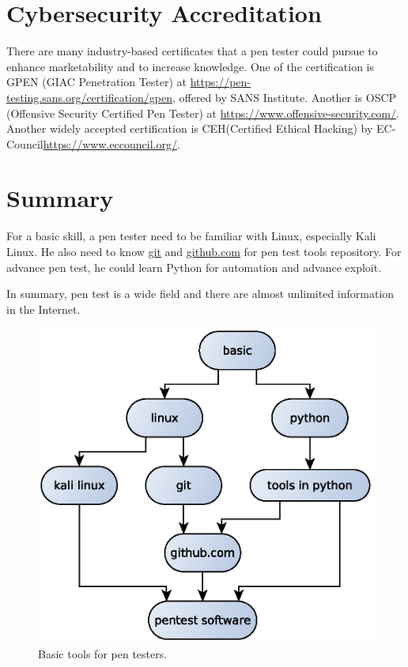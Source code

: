 \documentclass[7x9]{times}
\begin{document}
\section{Cybersecurity Accreditation}

There are many industry-based certificates that a pen tester
could pursue to enhance marketability and to increase knowledge. One of the 
certification is GPEN (GIAC Penetration Tester) at 
\url{https://pen-testing.sans.org/certification/gpen}, offered by SANS  
Institute. Another is OSCP (Offensive
Security Certified Pen Tester) at \url{https://www.offensive-security.com/}.
Another widely accepted certification is CEH(Certified Ethical Hacking) by 
EC-Council\url{https://www.eccouncil.org/}.

 
\section{Summary}

For a basic skill, a pen tester need to be familiar with Linux, especially Kali
Linux. He also need to know \url{git} and \url{github.com} for pen test tools
repository. For advance pen test, he could learn Python for automation and 
advance exploit.

In summary, pen test is a wide field and there are almost unlimited information
in the Internet. 
\begin{center}
	\begin{figure}[ht]
		\includegraphics[scale=.75]{tools.eps}
		\caption{Basic tools for pen testers.}
	\end{figure}
\end{center}
\end{document}
